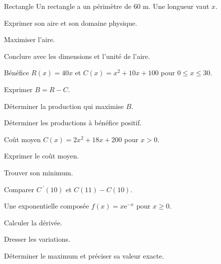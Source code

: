 \begingroup\renewcommand{\otBesoinPlace}[1]{}\begin{minipage}{\linewidth}
\begin{exercice}[2]{Rectangle}
Un rectangle a un périmètre de $60$ m. Une longueur vaut $x$.
\begin{questions}
\item Exprimer son aire et son domaine physique.
\item Maximiser l’aire.
\item Conclure avec les dimensions et l’unité de l’aire.
\end{questions}
\end{exercice}
\begin{exercice}[2]{Bénéfice}
$R(x)=40x$ et $C(x)=x^2+10x+100$ pour $0\leq x\leq30$.
\begin{questions}
\item Exprimer $B=R-C$.
\item Déterminer la production qui maximise $B$.
\item Déterminer les productions à bénéfice positif.
\end{questions}
\end{exercice}
\begin{exercice}[2]{Coût moyen}
$C(x)=2x^2+18x+200$ pour $x>0$.
\begin{questions}
\item Exprimer le coût moyen.
\item Trouver son minimum.
\item Comparer $C\,\!^{\prime}(10)$ et $C(11)-C(10)$.
\end{questions}
\end{exercice}
\begin{exercice}[2]{Une exponentielle composée}
$f(x)=x\mathrm e^{-x}$ pour $x\geq0$.
\begin{questions}
\item Calculer la dérivée.
\item Dresser les variations.
\item Déterminer le maximum et préciser sa valeur exacte.
\end{questions}
\end{exercice}
\end{minipage}\endgroup
\clearpage
{}

